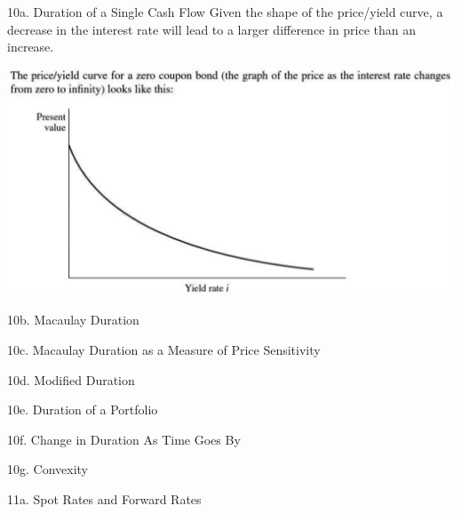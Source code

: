 \begin{CHPT_SUMM_AUTO}[label = {L.-10a}]{10a. Duration of a Single Cash Flow}
Given the shape of the price/yield curve, a decrease in the interest rate will lead to a larger difference in price than an increase.
\begin{center}
	\includegraphics[scale=0.3]{img/duration-SCF.png}
\end{center}
\end{CHPT_SUMM_AUTO}

\begin{CHPT_SUMM_AUTO}[label = {L.-10b}]{10b. Macaulay Duration}

\end{CHPT_SUMM_AUTO}

\begin{CHPT_SUMM_AUTO}[label = {L.-10c}]{10c. Macaulay Duration as a Measure of Price Sensitivity}

\end{CHPT_SUMM_AUTO}

\begin{CHPT_SUMM_AUTO}[label = {L.-10d}]{10d. Modified Duration}

\end{CHPT_SUMM_AUTO}

\begin{CHPT_SUMM_AUTO}[label = {L.-10e}]{10e. Duration of a Portfolio}

\end{CHPT_SUMM_AUTO}

\begin{CHPT_SUMM_AUTO}[label = {L.-10f}]{10f. Change in Duration As Time Goes By}

\end{CHPT_SUMM_AUTO}

\begin{CHPT_SUMM_AUTO}[label = {L.-10g}]{10g. Convexity}

\end{CHPT_SUMM_AUTO}

\begin{CHPT_SUMM_AUTO}[label = {L.-11a}]{11a. Spot Rates and Forward Rates}

\end{CHPT_SUMM_AUTO}

